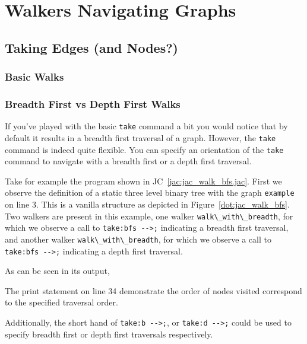 \chapter{Walkers Navigating Graphs}
\minitoc

\section{Taking Edges (and Nodes?)}

\subsection{Basic Walks}

\par
{}

\par
{}

\subsection{Breadth First vs Depth First Walks}
\par
{}
If you've played with the basic \lstinline{take} command a bit you would notice that by default it results in a breadth first traversal of a graph.
However, the \lstinline{take} command is indeed quite flexible.
You can specify an orientation of the \lstinline{take} command to navigate with a breadth first or a depth first traversal.
\par
{}
\par
Take for example the program shown in JC~\ref{jac:jac_walk_bfs.jac}.
First we observe the definition of a static three level binary tree with the graph \lstinline{example} on line 3.
This is a vanilla structure as depicted in Figure~\ref{dot:jac_walk_bfs}.
Two walkers are present in this example, one walker \lstinline{walk\_with\_breadth}, for which we observe a call to \lstinline{take:bfs -->;} indicating a breadth first traversal, and another walker \lstinline{walk\_with\_breadth}, for which we observe a call to \lstinline{take:bfs -->;} indicating a depth first traversal.
\par
As can be seen in its output,
\par
{}
The print statement on line 34 demonstrate the order of nodes visited correspond to the specified traversal order.
\par
Additionally, the short hand of \lstinline{take:b -->;}, or \lstinline{take:d -->;} could be used to specify breadth first or depth first traversals respectively.


